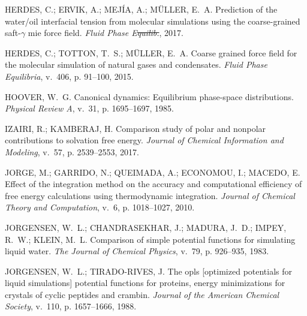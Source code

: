 \documentclass[
	12pt,				%
	openany,			%
	oneside,			%
	a4paper,			%
	english,			%
	brazil				%
	]{abntex2}
\providecommand{\DIFadd}[1]{{\protect\color{blue}\uwave{#1}}}
\providecommand{\DIFdel}[1]{{\protect\color{red}\sout{#1}}}
\providecommand{\DIFaddbegin}{}
\providecommand{\DIFaddend}{}
\providecommand{\DIFdelbegin}{}
\providecommand{\DIFdelend}{}
\providecommand{\DIFadd}[1]{{\protect\color{blue}\uwave{#1}}} %
\providecommand{\DIFdel}[1]{{\protect\color{red}\sout{#1}}}                      %
\providecommand{\DIFaddbegin}{} %
\providecommand{\DIFaddend}{} %
\providecommand{\DIFdelbegin}{} %
\providecommand{\DIFdelend}{} %
\begin{document}
\begin{thebibliography}{}
{HERDES, C.; ERVIK, A.; MEJ\'IA, A.; M\"ULLER, E.~A. Prediction of the
  water/oil interfacial tension from molecular simulations using the
  coarse-grained saft-$\gamma$ mie force field.
\emph{{F}luid {P}hase {E}\DIFdelbegin \DIFdel{quilib.}\DIFdelend \DIFaddbegin \DIFadd{quilibria}\DIFaddend }, 2017.}

{HERDES, C.; TOTTON, T.~S.; M\"ULLER, E.~A. Coarse grained force field for the
  molecular simulation of natural gases and condensates.
\emph{Fluid Phase Equilibria}, v.~406, p. 91–100, 2015.}

{HOOVER, W.~G. Canonical dynamics: Equilibrium phase-space distributions.
\emph{Physical Review A}, v.~31, p. 1695--1697, 1985.}

{IZAIRI, R.; KAMBERAJ, H. Comparison study of polar and nonpolar contributions
  to solvation free energy.
\emph{Journal of Chemical Information and Modeling}, v.~57, p. 2539–2553,
  2017.}

{JORGE, M.; GARRIDO, N.; QUEIMADA, A.; ECONOMOU, I.; MACEDO, E. Effect of the
  integration method on the accuracy and computational efficiency of free
  energy calculations using thermodynamic integration.
\emph{Journal of Chemical Theory and Computation}, v.~6, p. 1018–1027, 2010.}

{JORGENSEN, W.~L.; CHANDRASEKHAR, J.; MADURA, J.~D.; IMPEY, R.~W.; KLEIN, M.~L.
  Comparison of simple potential functions for simulating liquid water.
\emph{The Journal of Chemical Physics}, v.~79, p. 926--935, 1983.}

{JORGENSEN, W.~L.; TIRADO-RIVES, J. The opls [optimized potentials for liquid
  simulations] potential functions for proteins, energy minimizations for
  crystals of cyclic peptides and crambin.
\emph{Journal of the American Chemical Society}, v.~110, p. 1657--1666, 1988.}


\end{thebibliography}
\end{document}
